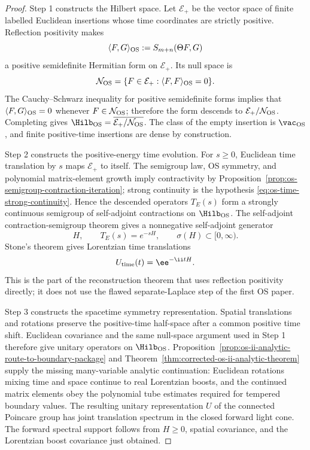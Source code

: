 \begin{proof}
Step 1 constructs the Hilbert space.  Let \(\mathcal E_+\) be the vector
space of finite labelled Euclidean insertions whose time coordinates are
strictly positive.  Reflection positivity makes
\[
  \langle F,G\rangle_{\rm OS}:=S_{m+n}(\Theta F,G)
\]
a positive semidefinite Hermitian form on \(\mathcal E_+\).  Its null space is
\[
  \mathcal N_{\rm OS}
  =
  \{F\in\mathcal E_+:\langle F,F\rangle_{\rm OS}=0\}.
\]
The Cauchy--Schwarz inequality for positive semidefinite forms implies that
\(\langle F,G\rangle_{\rm OS}=0\) whenever \(F\in\mathcal N_{\rm OS}\);
therefore the form descends to \(\mathcal E_+/\mathcal N_{\rm OS}\).
Completing gives
\(\Hilb_{\rm OS}=\overline{\mathcal E_+/\mathcal N_{\rm OS}}\).  The class of
the empty insertion is \(\vac_{\rm OS}\), and finite positive-time insertions
are dense by construction.

Step 2 constructs the positive-energy time evolution.  For \(s\ge0\),
Euclidean time translation by \(s\) maps \(\mathcal E_+\) to itself.  The
semigroup law, OS symmetry, and polynomial matrix-element growth imply
contractivity by Proposition~\ref{prop:os-semigroup-contraction-iteration};
strong continuity is the hypothesis
\eqref{eq:os-time-strong-continuity}.  Hence the descended operators
\(T_E(s)\) form a strongly continuous semigroup of self-adjoint contractions
on \(\Hilb_{\rm OS}\).  The self-adjoint contraction-semigroup theorem gives
a nonnegative self-adjoint generator
\[
  H,\qquad T_E(s)=e^{-sH},\qquad \sigma(H)\subset[0,\infty).
\]
Stone's theorem gives Lorentzian time translations
\[
  U_{\rm time}(t)=\ee^{-\ii tH}.
\]
This is the part of the reconstruction theorem that uses reflection
positivity directly; it does not use the flawed separate-Laplace step of the
first OS paper.

Step 3 constructs the spacetime symmetry representation.  Spatial
translations and rotations preserve the positive-time half-space after a
common positive time shift.  Euclidean covariance and the same null-space
argument used in Step 1 therefore give unitary operators on
\(\Hilb_{\rm OS}\).  Proposition~\ref{prop:os-ii-analytic-route-to-boundary-package}
and Theorem~\ref{thm:corrected-os-ii-analytic-theorem} supply the missing
many-variable analytic continuation: Euclidean rotations mixing time and
space continue to real Lorentzian boosts, and the continued matrix elements
obey the polynomial tube estimates required for tempered boundary values.
The resulting unitary representation \(U\) of the connected Poincare group
has joint translation spectrum in the closed forward light cone.  The forward
spectral support follows from \(H\ge0\), spatial covariance, and the
Lorentzian boost covariance just obtained.


\end{proof}
